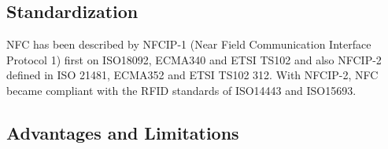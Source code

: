 \subsection{Standardization}
NFC has been described by NFCIP-1 (Near Field Communication Interface Protocol 1) first on ISO18092, ECMA340 and ETSI TS102 and also NFCIP-2 defined in ISO 21481, ECMA352 and ETSI TS102 312.
With NFCIP-2, NFC became compliant with the RFID standards of ISO14443 and ISO15693.






\subsection{Advantages and Limitations}








